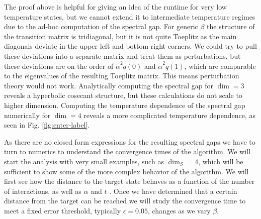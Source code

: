 \documentclass{article}
\begin{document}
The proof above is helpful for giving an idea of the runtime for very low temperature states, but we cannot extend it to intermediate temperature regimes due to the ad-hoc computation of the spectral gap. For generic $\beta$ the structure of the transition matrix is tridiagonal, but it is not quite Toeplitz as the main diagonals deviate in the upper left and bottom right corners. We could try to pull these deviations into a separate matrix and treat them as perturbations, but these deviations are on the order of $\widetilde{\alpha}^2 q(0)$ and $\widetilde{\alpha}^2 q(1)$, which are comparable to the eigenvalues of the resulting Toeplitz matrix. This means perturbation theory would not work. Analytically computing the spectral gap for $\dim = 3$ reveals a hyperbolic cosecant structure, but these calculations do not scale to higher dimension. Computing the temperature dependence of the spectral gap numerically for $\dim = 4$ reveals a more complicated temperature dependence, as seen in Fig. \ref{fig:enter-label}. 


As there are no closed form expressions for the resulting spectral gaps we have to turn to numerics to understand the convergence times of the algorithm. We will start the analysis with very small examples, such as $\dim_S = 4$, which will be sufficient to show some of the more complex behavior of the algorithm. We will first see how the distance to the target state behaves as a function of the number of interactions, as well as $\alpha$ and $t$ . Once we have determined that a certain distance from the target can be reached we will study the convergence time to meet a fixed error threshold, typically $\epsilon = 0.05$, changes as we vary $\beta$. 
\end{document}
